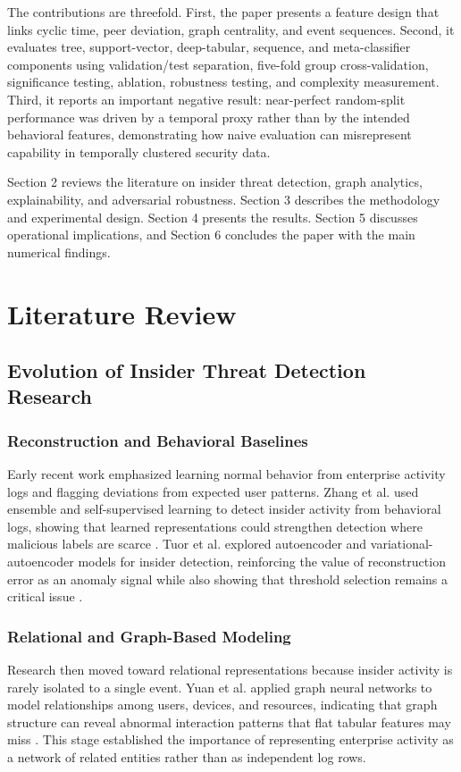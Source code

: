 \documentclass[journal]{IEEEtran}
\begin{document}
The contributions are threefold. First, the paper presents a feature design that links cyclic time, peer deviation, graph centrality, and event sequences. Second, it evaluates tree, support-vector, deep-tabular, sequence, and meta-classifier components using validation/test separation, five-fold group cross-validation, significance testing, ablation, robustness testing, and complexity measurement. Third, it reports an important negative result: near-perfect random-split performance was driven by a temporal proxy rather than by the intended behavioral features, demonstrating how naive evaluation can misrepresent capability in temporally clustered security data.

Section 2 reviews the literature on insider threat detection, graph analytics, explainability, and adversarial robustness. Section 3 describes the methodology and experimental design. Section 4 presents the results. Section 5 discusses operational implications, and Section 6 concludes the paper with the main numerical findings.

\section{Literature Review}
\subsection{Evolution of Insider Threat Detection Research}
\subsubsection{Reconstruction and Behavioral Baselines}
Early recent work emphasized learning normal behavior from enterprise activity logs and flagging deviations from expected user patterns. Zhang et al. used ensemble and self-supervised learning to detect insider activity from behavioral logs, showing that learned representations could strengthen detection where malicious labels are scarce \cite{zhang2021ensemble}. Tuor et al. explored autoencoder and variational-autoencoder models for insider detection, reinforcing the value of reconstruction error as an anomaly signal while also showing that threshold selection remains a critical issue \cite{tuor2021autoencoder}.

\subsubsection{Relational and Graph-Based Modeling}
Research then moved toward relational representations because insider activity is rarely isolated to a single event. Yuan et al. applied graph neural networks to model relationships among users, devices, and resources, indicating that graph structure can reveal abnormal interaction patterns that flat tabular features may miss \cite{yuan2022gnn}. This stage established the importance of representing enterprise activity as a network of related entities rather than as independent log rows.
\end{document}
